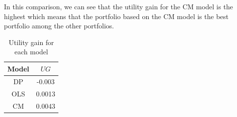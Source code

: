\begin{enumerate}[(a)]
    In this comparison,  we can see that the utility gain for the CM model is the highest which means that the portfolio based on the CM model is the best portfolio among the other portfolios.

    \begin{table}[htbp]
        \centering
        \begin{tabular}{c|c}
            Model & $UG$ \\
            \hline
            DP & -0.003 \\
            OLS & 0.0013 \\
            CM & 0.0043 \\
        \end{tabular}
        \caption{Utility gain for each model}
    \end{table}


\end{enumerate}